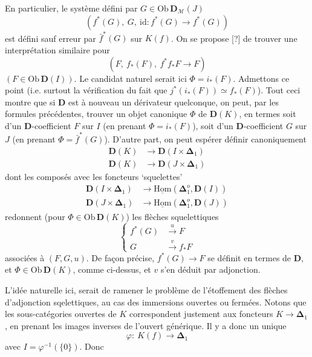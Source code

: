 \documentclass[11pt]{article}
\newcommand{\msp}[1]{\marginpar{\footnotesize [#1]}}
\newcommand{\uHom}{\underline{\mathrm{Hom}}}
\newcommand{\Ob}{\mathrm{Ob}\,}
\newcommand{\bDelta}{\boldsymbol{\Delta}}
\newcommand{\id}{\mathrm{id}}
\begin{document}
En particulier, le système défini par $G \in \Ob \mathbf{D}_{\mathcal{M}}(J)$
\[ (f^*(G),\ G,\ \id : f^*(G) \longrightarrow f^*(G)) \]
est défini sauf erreur par $\bar{f}^*(G)$ sur $K(f)$. On se propose [?] de trouver une interprétation similaire pour
\[ (F,\ f_*(F),\ f^*f_*F \longrightarrow F) \]
$(F \in \Ob \mathbf{D}(I))$. Le candidat naturel serait ici $\Phi = i_*(F)$. Admettons ce point (i.e. surtout la vérification du fait que $j^*(i_*(F)) \simeq f_*(F)$). Tout ceci montre que si $\mathbf{D}$ est à nouveau un dérivateur quelconque, on peut, par les formules précédentes, trouver un objet canonique $\Phi$ de $\mathbf{D}(K)$, en termes soit d'un $\mathbf{D}$-coefficient $F$ sur $I$ (en prenant $\Phi = i_*(F)$), soit d'un $\mathbf{D}$-coefficient $G$ sur $J$ (en prenant $\Phi = \bar{f}^*(G)$). D'autre part, on peut espérer définir canoniquement
\[
\begin{aligned}
\mathbf{D}(K) &\longrightarrow \mathbf{D}(I \times \bDelta_1)\\
\mathbf{D}(K) &\longrightarrow \mathbf{D}(J \times \bDelta_1)
\end{aligned}
\]
dont les composés avec les foncteurs ‘squelettes’
\[
\begin{aligned}
\mathbf{D}(I \times \bDelta_1) &\longrightarrow \uHom(\bDelta_1^o, \mathbf{D}(I))\\
\mathbf{D}(J \times \bDelta_1) &\longrightarrow \uHom(\bDelta_1^o, \mathbf{D}(J))
\end{aligned}
\]
\msp{page 83}
redonnent (pour $\Phi \in \Ob \mathbf{D}(K)$) les flèches squelettiques
\[
\left\{
\begin{aligned}
f^*(G) &\xrightarrow{\ u\ } F\\
G &\xrightarrow{\ v\ } f_*F
\end{aligned}
\right.
\]
associées à $(F,G,u)$. De façon précise, $f^*(G) \longrightarrow F$ se définit en termes de $\mathbf{D}$, et $\Phi \in \Ob \mathbf{D}(K)$, comme ci-dessus, et $v$ s'en déduit par adjonction.

L'idée naturelle ici, serait de ramener le problème de l'étoffement des flèches d'adjonction sqelettiques, au cas des immersions ouvertes ou fermées. Notons que les sous-catégories ouvertes de $K$ correspondent justement aux foncteurs $K \longrightarrow \bDelta_1$, en prenant les images inverses de l'ouvert générique. Il y a donc un unique %
\[ \varphi :\ K(f) \longrightarrow \bDelta_1 \]
avec $I = \varphi^{-1}(\{0\})$. Donc
\end{document}
